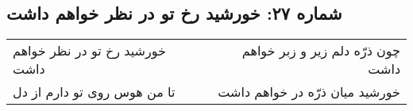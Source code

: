 \begin{center}
\section*{شماره ۲۷: خورشید رخ تو در نظر خواهم داشت}
\label{sec:027}
\begin{longtable}{l p{0.5cm} r}
خورشید رخ تو در نظر خواهم داشت
&&
چون ذرّه دلم زیر و زبر خواهم داشت
\\
تا من هوس روی تو دارم از دل
&&
خورشید میان ذرّه در خواهم داشت
\\
\end{longtable}
\end{center}
